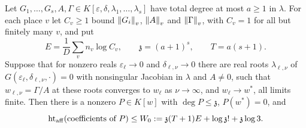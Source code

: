 \begin{lemma}
\label{lem:qc-elimination}
Let $G_1,\ldots,G_s,A,\Gamma\in K[\varepsilon,\delta,\lambda_1,\ldots,\lambda_s]$
have total degree at most $a\ge1$ in $\lambda$. For each place $v$ let
$C_v\ge1$ bound $\left\lVert G_i\right\rVert_v$, $\left\lVert A\right\rVert_v$ and $\left\lVert\Gamma\right\rVert_v$, with $C_v=1$
for all but finitely many $v$, and put
\[
E=\frac1D\sum_vn_v\log C_v,\qquad \mathfrak z=(a+1)^s,\qquad T=a(s+1).
\]
Suppose that for nonzero reals $\varepsilon_\ell\to0$ and
$\delta_{\ell,\nu}\to0$ there are real roots $\lambda_{\ell,\nu}$ of
$G(\varepsilon_\ell,\delta_{\ell,\nu},\cdot)=0$ with nonsingular Jacobian in
$\lambda$ and $A\ne0$, such that $w_{\ell,\nu}=\Gamma/A$ at these roots
converges to $w_\ell$ as $\nu\to\infty$, and $w_\ell\to w^*$, all limits
finite. Then there is a nonzero $P\in K[w]$ with $\deg P\le\mathfrak z$, $P(w^*)=0$,
and
\[
\operatorname{ht}_{\rm aff}(\text{coefficients of }P)\le W_0:=\mathfrak z(T+1)E+\log\mathfrak z!+\mathfrak z\log3 .
\]
\end{lemma}

